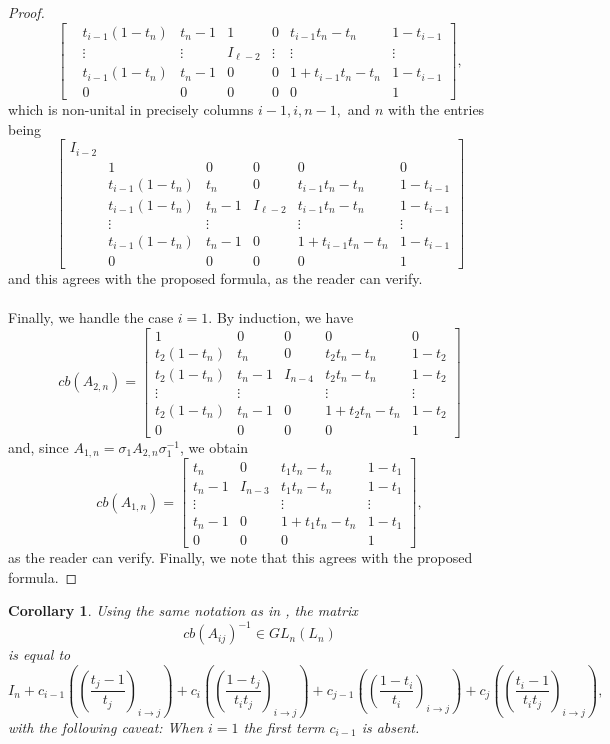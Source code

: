 \documentclass[11pt]{article}
\newtheorem{corollary}[lemma]{Corollary}
\begin{document}
\begin{proof}
$$\begin{bmatrix}
		&t_{i-1}(1-t_n)&t_n-1 & 1 & 0 &t_{i-1}t_n-t_n&1-t_{i-1}\\
		&\vdots & \vdots & I_{\ell-2}& \vdots & \vdots &\vdots \\
		&t_{i-1}(1-t_n)&t_n-1 & 0 & 0 & 1+t_{i-1}t_n-t_n &1-t_{i-1}\\
		&0& 0& 0& 0& 0& 1
	\end{bmatrix},$$
	which is non-unital in precisely columns $i-1,i,n-1,$ and $n$ with the entries being
	$$\begin{bmatrix}
		I_{i-2}&\\
		&1 & 0 & 0 & 0&0\\
		&t_{i-1}(1-t_n)&t_n & 0 &t_{i-1}t_n-t_n&1-t_{i-1}\\
		&t_{i-1}(1-t_n)&t_n-1 & I_{\ell-2} & t_{i-1}t_n-t_n&1-t_{i-1}\\
		&\vdots &\vdots & & \vdots &\vdots \\
		&t_{i-1}(1-t_n)&t_n-1 & 0 & 1+t_{i-1}t_n-t_n & 1-t_{i-1}\\
		&0 & 0 & 0 & 0 & 1
	\end{bmatrix}$$
	and this agrees with the proposed formula, as the reader can verify.
	\\
	\\
	Finally, we handle the case $i=1$. By induction, we have 
	$$cb(A_{2,n})=
	\begin{bmatrix}
		1 & 0 & 0 & 0&0\\
		t_2(1-t_n)&t_n & 0 &t_2t_n-t_n&1-t_2\\
		t_2(1-t_n)&t_n-1 & I_{n-4} & t_2t_n-t_n&1-t_2\\
		\vdots &\vdots & & \vdots&\vdots \\
		t_2(1-t_n)&t_n-1 & 0 & 1+t_2t_n-t_n&1-t_2\\
		0 & 0 & 0 & 0& 1
	\end{bmatrix}
	$$
	and, since $A_{1,n}=\sigma_1A_{2,n}\sigma_1^{-1}$, we obtain 
	$$cb(A_{1,n})=
	\begin{bmatrix}
		t_n & 0 &t_1t_n-t_n&1-t_1\\
		t_n-1 & I_{n-3} & t_1t_n-t_n&1-t_1\\
		\vdots & & \vdots & \vdots\\
		t_n-1 & 0 & 1+t_1t_n-t_n&1-t_1\\
		0 & 0 & 0 & 1
	\end{bmatrix},
	$$
	as the reader can verify. Finally, we note that this agrees
	with the proposed formula.
\end{proof}

\begin{corollary}\label{cor:inv}
	Using the same notation as in , the matrix
	\begin{equation*}
		cb(A_{ij})^{-1}\in GL_n(L_n)  
	\end{equation*}
	is equal to
	$$
	I_n +c_{i-1}\left(\left(\frac{t_j-1}{t_j}\right)_{i\to j}\right)
	+ c_i\left(\left(\frac{1-t_j}{t_it_j}\right)_{i\to j}\right)
	+ c_{j-1}\left(\left(\frac{1-t_i}{t_i}\right)_{i\to j}\right) 
	+ c_{j}\left(\left(\frac{t_i-1}{t_it_j}\right)_{i\to j}\right),
	$$
	with the following caveat: When $i=1$ the first term $c_{i-1}$ is absent.
\end{corollary}
\end{document}
